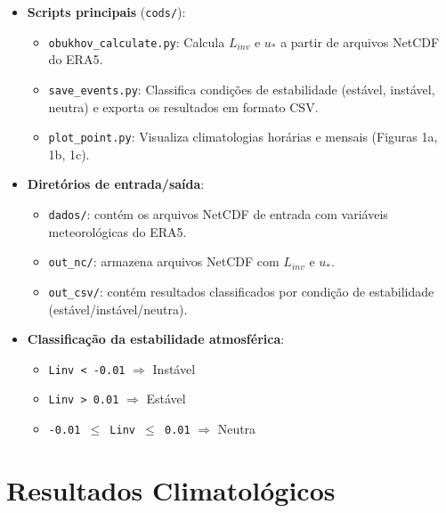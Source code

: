 \documentclass[12pt]{article}
\begin{document}
\begin{itemize}
    \item \textbf{Scripts principais} (\texttt{cods/}):
    \begin{itemize}
        \item \texttt{obukhov\_calculate.py}: Calcula $L_{inv}$ e $u_*$ a partir de arquivos NetCDF do ERA5.
        \item \texttt{save\_events.py}: Classifica condições de estabilidade (estável, instável, neutra) e exporta os resultados em formato CSV.
        \item \texttt{plot\_point.py}: Visualiza climatologias horárias e mensais (Figuras 1a, 1b, 1c).
    \end{itemize}

    \item \textbf{Diretórios de entrada/saída}:
    \begin{itemize}
        \item \texttt{dados/}: contém os arquivos NetCDF de entrada com variáveis meteorológicas do ERA5.
        \item \texttt{out\_nc/}: armazena arquivos NetCDF com $L_{inv}$ e $u_*$.
        \item \texttt{out\_csv/}: contém resultados classificados por condição de estabilidade (estável/instável/neutra).
    \end{itemize}

    \item \textbf{Classificação da estabilidade atmosférica}:
    \begin{itemize}
        \item \texttt{Linv < -0.01} $\Rightarrow$ Instável
        \item \texttt{Linv > 0.01} $\Rightarrow$ Estável
        \item \texttt{-0.01 $\leq$ Linv $\leq$ 0.01} $\Rightarrow$ Neutra
    \end{itemize}
\end{itemize}

\section{Resultados Climatológicos}
\end{document}
